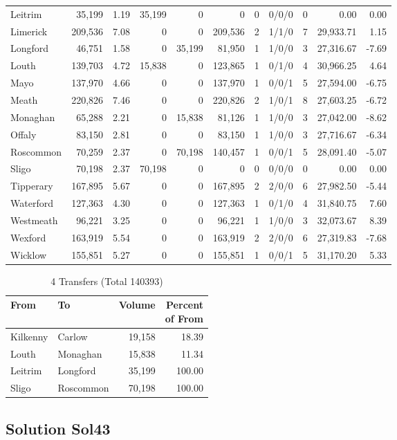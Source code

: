 \documentclass[a4paper]{article}
\begin{document}
\begin{longtable}{lrrrrrrlrrr}
Leitrim&35,199& 1.19&35,199&0&0&0&0/0/0&0& 0.00& 0.00\\ 
Limerick&209,536& 7.08&0&0&209,536&2&1/1/0&7&29,933.71& 1.15\\ 
Longford&46,751& 1.58&0&35,199&81,950&1&1/0/0&3&27,316.67&-7.69\\ 
Louth&139,703& 4.72&15,838&0&123,865&1&0/1/0&4&30,966.25& 4.64\\ 
Mayo&137,970& 4.66&0&0&137,970&1&0/0/1&5&27,594.00&-6.75\\ 
Meath&220,826& 7.46&0&0&220,826&2&1/0/1&8&27,603.25&-6.72\\ 
Monaghan&65,288& 2.21&0&15,838&81,126&1&1/0/0&3&27,042.00&-8.62\\ 
Offaly&83,150& 2.81&0&0&83,150&1&1/0/0&3&27,716.67&-6.34\\ 
Roscommon&70,259& 2.37&0&70,198&140,457&1&0/0/1&5&28,091.40&-5.07\\ 
Sligo&70,198& 2.37&70,198&0&0&0&0/0/0&0& 0.00& 0.00\\ 
Tipperary&167,895& 5.67&0&0&167,895&2&2/0/0&6&27,982.50&-5.44\\ 
Waterford&127,363& 4.30&0&0&127,363&1&0/1/0&4&31,840.75& 7.60\\ 
Westmeath&96,221& 3.25&0&0&96,221&1&1/0/0&3&32,073.67& 8.39\\ 
Wexford&163,919& 5.54&0&0&163,919&2&2/0/0&6&27,319.83&-7.68\\ 
Wicklow&155,851& 5.27&0&0&155,851&1&0/0/1&5&31,170.20& 5.33\\ 
\end{longtable}

\begin{table}[htbp]
\caption{4 Transfers (Total 140393)}
\centering
\begin{tabular}{llrr} \toprule
From &To &Volume &\shortstack{Percent\\of From} \\ \midrule
Kilkenny&Carlow&19,158&18.39\\ 
Louth&Monaghan&15,838&11.34\\ 
Leitrim&Longford&35,199&100.00\\ 
Sligo&Roscommon&70,198&100.00\\ 
\bottomrule
\end{tabular}
\end{table}

\clearpage
\subsection{Solution Sol43}
\end{document}

